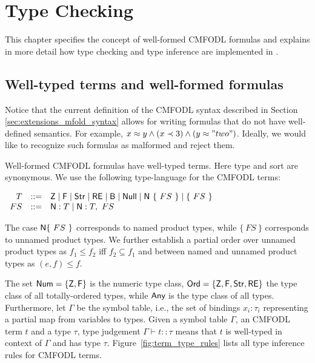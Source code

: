\chapter{Type Checking}
\label{chap:type_checking}

This chapter specifies the concept of well-formed CMFODL formulas and explains in more detail how type checking and type inference are implemented in \MonPolyN.

\section{Well-typed terms and well-formed formulas}

Notice that the current definition of the CMFODL syntax described in Section \ref{sec:extensions_mfold_syntax} allows for
writing formulas that do not have well-defined semantics. For example, $x\approx y \land (x \prec 3) \land (y \approx "two")$. Ideally, we would like to recognize such formulas as malformed and reject them.

Well-formed CMFODL formulas have well-typed terms. Here type and sort are synonymous.
We use the following type-language for the CMFODL terms:

\begin{center}
	$
		\begin{array}{r c l }
			T  & ::= & \mathsf{Z} \mid \mathsf{F} \mid \mathsf{Str} \mid \mathsf{RE} \mid \mathsf{B} \mid \mathsf{Null} \mid \mathsf{N}\ \{\ FS\ \} \mid \{\ FS\ \} \\
			FS & ::= & \mathsf{N} : T \mid \mathsf{N} : T,\ FS
		\end{array}
	$
\end{center}
The case $\mathsf{N} \{\ FS\ \}$ corresponds to named product types, while $\{\ FS\ \}$ corresponds to unnamed product types. We further establish a partial order over unnamed product types as $f_1\leq f_2$ iff $f_2\subseteq f_1$ and between named and unnamed product types as $(e,f)\leq f$.

The set $\mathsf{Num}{}{}=\{\mathsf{Z},\mathsf{F}\}$ is the numeric type class, $\mathsf{Ord}{}{} = \{\mathsf{Z}{}{}, \mathsf{F}, \mathsf{Str}, \mathsf{RE}\}$ the type class of all totally-ordered types, while
$\mathsf{Any}{}{}$ is the type class of all types. Furthermore, let $\Gamma$ be the symbol table, i.e., the set of bindings $x_i:\tau_i$ representing a partial map from variables to types. Given a symbol table $\Gamma$, an CMFODL term $t$ and a type $\tau$, type judgement $\Gamma \vdash  t :: \tau$ means that $t$ is well-typed in context of $\Gamma$ and has type $\tau$. Figure~\ref{fig:term_type_rules} lists all type inference rules for CMFODL terms.

